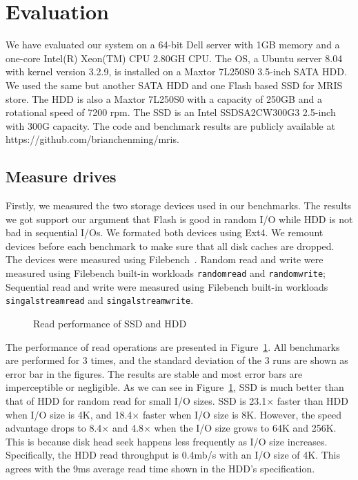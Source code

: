 \section{Evaluation} \label{sec:eval}

We have evaluated our system on a 64-bit Dell server with 1GB memory
and a one-core Intel(R) Xeon(TM) CPU 2.80GH CPU. The OS, a Ubuntu
server 8.04 with kernel version 3.2.9, is installed on a Maxtor
7L250S0 3.5-inch SATA HDD. We used the same but another SATA HDD and
one Flash based SSD for MRIS store. The HDD is also a Maxtor 7L250S0
with a capacity of 250GB and a rotational speed of 7200 rpm.  The SSD
is an Intel SSDSA2CW300G3 2.5-inch with 300G capacity.  The code and
benchmark results are publicly available at
https://github.com/brianchenming/mris.

\subsection{Measure drives}
\label{sec:drives}

Firstly, we measured the two storage devices used in our benchmarks.
The results we got support our argument that Flash is good in random
I/O while HDD is not bad in sequential I/Os. We formated both devices
using Ext4. We remount devices before each benchmark to make sure that
all disk caches are dropped. The devices were measured using
Filebench~\cite{filebench-web}. Random read and write were measured
using Filebench built-in workloads \texttt{randomread} and
\texttt{randomwrite}; Sequential read and write were measured using
Filebench built-in workloads \texttt{singalstreamread} and
\texttt{singalstreamwrite}.

\begin{figure}[t]
\begin{centering}
\caption{Read performance of SSD and HDD}
\label{fig:driveread}
\end{centering}
\end{figure}

The performance of read operations are presented in
Figure~\ref{fig:driveread}. All benchmarks are performed for 3 times,
and the standard deviation of the 3 runs are shown as error bar in the
figures. The results are stable and most error bars are imperceptible
or negligible. As we can see in Figure~\ref{fig:driveread}, SSD is
much better than that of HDD for random read for small I/O sizes. SSD
is 23.1$\times$ faster than HDD when I/O size is 4K, and 18.4$\times$
faster when I/O size is 8K. However, the speed advantage drops to
8.4$\times$ and 4.8$\times$ when the I/O size grows to 64K and 256K.
This is because disk head seek happens less frequently as I/O size
increases. Specifically, the HDD read throughput is 0.4mb/s with an
I/O size of 4K. This agrees with the 9ms average read time shown in
the HDD's specification.  

